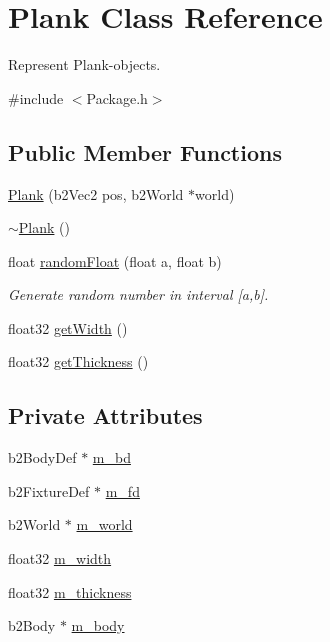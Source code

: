 \hypertarget{classPlank}{\section{Plank Class Reference}
\label{classPlank}
}


Represent Plank-\/objects.  




{\ttfamily \#include $<$Package.\-h$>$}

\subsection*{Public Member Functions}
\begin{DoxyCompactItemize}
\item 
\hyperlink{classPlank_ad76b1cdbf4909225eb58acaa577bcd5d}{Plank} (b2\-Vec2 pos, b2\-World $\ast$world)
\item 
\hyperlink{classPlank_a478e9bd1531adca6e8250ae11d0ed07a}{$\sim$\-Plank} ()
\item 
float \hyperlink{classPlank_a3f38a8e62a692f49cfcccf6692069ceb}{random\-Float} (float a, float b)
\begin{DoxyCompactList}\small\item\em Generate random number in interval \mbox{[}a,b\mbox{]}. \end{DoxyCompactList}\item 
float32 \hyperlink{classPlank_a2f83307bc8a6a95222a343395475dce7}{get\-Width} ()
\item 
float32 \hyperlink{classPlank_a5203208bd700934affd95cc0b7bd7234}{get\-Thickness} ()
\end{DoxyCompactItemize}
\subsection*{Private Attributes}
\begin{DoxyCompactItemize}
\item 
b2\-Body\-Def $\ast$ \hyperlink{classPlank_a2d0f77c8e5716733d9715bdd641987b4}{m\-\_\-bd}
\item 
b2\-Fixture\-Def $\ast$ \hyperlink{classPlank_ad9ee0dbf22fe79689efddda7d7a94347}{m\-\_\-fd}
\item 
b2\-World $\ast$ \hyperlink{classPlank_a13c403210d33ed7d7183cfd6dd71b494}{m\-\_\-world}
\item 
float32 \hyperlink{classPlank_a188c7ef7af7fdc72d9e4925299248677}{m\-\_\-width}
\item 
float32 \hyperlink{classPlank_aba0b2459614c6427abf50c5b16c623c3}{m\-\_\-thickness}
\item 
b2\-Body $\ast$ \hyperlink{classPlank_a311d983aad3e0cd5d5059edb37f5e1b6}{m\-\_\-body}
\end{DoxyCompactItemize}


